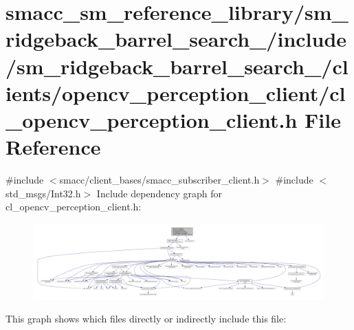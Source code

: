 \hypertarget{sm__ridgeback__barrel__search__1_2include_2sm__ridgeback__barrel__search__1_2clients_2opencv__peeb5457d7f99e3e3e8b4e825cafa677f7}{}\section{smacc\+\_\+sm\+\_\+reference\+\_\+library/sm\+\_\+ridgeback\+\_\+barrel\+\_\+search\+\_/include/sm\+\_\+ridgeback\+\_\+barrel\+\_\+search\+\_/clients/opencv\+\_\+perception\+\_\+client/cl\+\_\+opencv\+\_\+perception\+\_\+client.h File Reference}
\label{sm__ridgeback__barrel__search__1_2include_2sm__ridgeback__barrel__search__1_2clients_2opencv__peeb5457d7f99e3e3e8b4e825cafa677f7}
{\ttfamily \#include $<$smacc/client\+\_\+bases/smacc\+\_\+subscriber\+\_\+client.\+h$>$}\newline
{\ttfamily \#include $<$std\+\_\+msgs/\+Int32.\+h$>$}\newline
Include dependency graph for cl\+\_\+opencv\+\_\+perception\+\_\+client.\+h\+:
\nopagebreak
\begin{figure}[H]
\begin{center}
\leavevmode
\includegraphics[width=350pt]{sm__ridgeback__barrel__search__1_2include_2sm__ridgeback__barrel__search__1_2clients_2opencv__peb10b38be08a2911659d9a0c4a98feb08}
\end{center}
\end{figure}
This graph shows which files directly or indirectly include this file\+:
\nopagebreak
